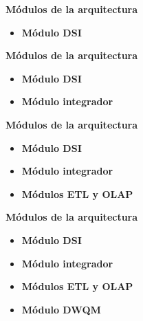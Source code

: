 \documentclass{fancyslides}
\begin{document}
\begin{frame}
\misc
{ \textbf{\Large Módulos de la arquitectura}
\newline
\newline

\begin{itemize}
  \item \textbf{Módulo DSI}
\end{itemize}

}
\end{frame}

\begin{frame}
\misc
{ \textbf{\Large Módulos de la arquitectura}
\newline
\newline

\begin{itemize}
  \item \textbf{Módulo DSI}
  \item \textbf{Módulo integrador}
\end{itemize}

}
\end{frame}

\begin{frame}
\misc
{ \textbf{\Large Módulos de la arquitectura}
\newline
\newline

\begin{itemize}
  \item \textbf{Módulo DSI}
  \item \textbf{Módulo integrador}
  \item \textbf{Módulos ETL y OLAP}
\end{itemize}

}
\end{frame}

\begin{frame}
\misc
{ \textbf{\Large Módulos de la arquitectura}
\newline
\newline

\begin{itemize}
  \item \textbf{Módulo DSI}
  \item \textbf{Módulo integrador}
  \item \textbf{Módulos ETL y OLAP}
  \item \textbf{Módulo DWQM}
\end{itemize}

}
\end{frame}
\end{document}
